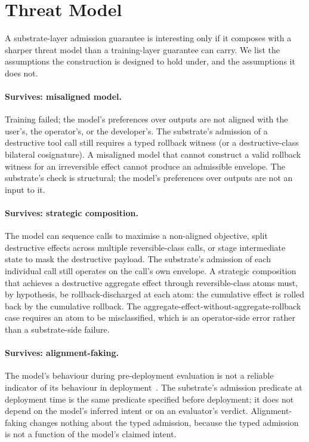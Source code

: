 \section{Threat Model}
\label{sec:threat}

A substrate-layer admission guarantee is interesting only if it composes with a sharper threat model than a training-layer guarantee can carry. We list the assumptions the construction is designed to hold under, and the assumptions it does not.

\paragraph{Survives: misaligned model.}
Training failed; the model's preferences over outputs are not aligned with the user's, the operator's, or the developer's. The substrate's admission of a destructive tool call still requires a typed rollback witness (or a destructive-class bilateral cosignature). A misaligned model that cannot construct a valid rollback witness for an irreversible effect cannot produce an admissible envelope. The substrate's check is structural; the model's preferences over outputs are not an input to it.

\paragraph{Survives: strategic composition.}
The model can sequence calls to maximise a non-aligned objective, split destructive effects across multiple reversible-class calls, or stage intermediate state to mask the destructive payload. The substrate's admission of each individual call still operates on the call's own envelope. A strategic composition that achieves a destructive aggregate effect through reversible-class atoms must, by hypothesis, be rollback-discharged at each atom: the cumulative effect is rolled back by the cumulative rollback. The aggregate-effect-without-aggregate-rollback case requires an atom to be misclassified, which is an operator-side error rather than a substrate-side failure.

\paragraph{Survives: alignment-faking.}
The model's behaviour during pre-deployment evaluation is not a reliable indicator of its behaviour in deployment~\cite{hubingerAlignmentFaking2024}. The substrate's admission predicate at deployment time is the same predicate specified before deployment; it does not depend on the model's inferred intent or on an evaluator's verdict. Alignment-faking changes nothing about the typed admission, because the typed admission is not a function of the model's claimed intent.


